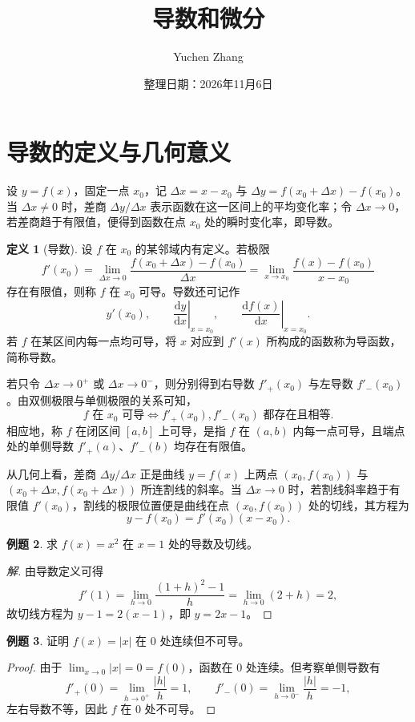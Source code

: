 \documentclass[UTF8,fontset=fandol,a4paper,12pt]{ctexart}
\title{导数和微分}
\author{Yuchen Zhang}
\date{整理日期：2026年11月6日}
\makeatletter
\newcommand{\dd}{\mathrm d}
\theoremstyle{definition}
\newtheorem{definition}{定义}[section]
\newtheorem{example}[definition]{例题}
\renewcommand{\maketitle}{\begin{center}{\LARGE\bfseries\@title\par}\vspace{0.6em}\@author\par\vspace{0.2em}{\small\@date\par}\end{center}}
\makeatother
\begin{document}
\maketitle
\section{导数的定义与几何意义}
设 $y=f(x)$，固定一点 $x_0$，记 $\Delta x=x-x_0$ 与 $\Delta y=f(x_0+\Delta x)-f(x_0)$。当 $\Delta x\ne0$ 时，差商 $\Delta y/\Delta x$ 表示函数在这一区间上的平均变化率；令 $\Delta x\to0$，若差商趋于有限值，便得到函数在点 $x_0$ 处的瞬时变化率，即导数。

\begin{definition}[导数]
设 $f$ 在 $x_0$ 的某邻域内有定义。若极限
\[
 \boxed{f'(x_0)=\lim_{\Delta x\to0}
 \frac{f(x_0+\Delta x)-f(x_0)}{\Delta x}
 =\lim_{x\to x_0}\frac{f(x)-f(x_0)}{x-x_0}}
\]
存在有限值，则称 $f$ 在 $x_0$ 可导。导数还可记作
\[
 y'(x_0),\qquad \left.\frac{\dd y}{\dd x}\right|_{x=x_0},
 \qquad \left.\frac{\dd f(x)}{\dd x}\right|_{x=x_0}.
\]
若 $f$ 在某区间内每一点均可导，将 $x$ 对应到 $f'(x)$ 所构成的函数称为导函数，简称导数。
\end{definition}

若只令 $\Delta x\to0^+$ 或 $\Delta x\to0^-$，则分别得到右导数 $f'_+(x_0)$ 与左导数 $f'_-(x_0)$。由双侧极限与单侧极限的关系可知，
\[
 f\text{ 在 }x_0\text{ 可导}
 \iff f'_+(x_0),f'_-(x_0)\text{ 都存在且相等}.
\]
相应地，称 $f$ 在闭区间 $[a,b]$ 上可导，是指 $f$ 在 $(a,b)$ 内每一点可导，且端点处的单侧导数 $f'_+(a)$、$f'_-(b)$ 均存在有限值。

从几何上看，差商 $\Delta y/\Delta x$ 正是曲线 $y=f(x)$ 上两点 $(x_0,f(x_0))$ 与 $(x_0+\Delta x,f(x_0+\Delta x))$ 所连割线的斜率。当 $\Delta x\to0$ 时，若割线斜率趋于有限值 $f'(x_0)$，割线的极限位置便是曲线在点 $(x_0,f(x_0))$ 处的切线，其方程为
\[
 y-f(x_0)=f'(x_0)(x-x_0).
\]

\begin{example}
求 $f(x)=x^2$ 在 $x=1$ 处的导数及切线。
\end{example}
\begin{proof}[解]
由导数定义可得
\[
 f'(1)=\lim_{h\to0}\frac{(1+h)^2-1}{h}
 =\lim_{h\to0}(2+h)=2,
\]
故切线方程为 $y-1=2(x-1)$，即 $y=2x-1$。
\end{proof}

\begin{example}
证明 $f(x)=|x|$ 在 $0$ 处连续但不可导。
\end{example}
\begin{proof}
由于 $\lim_{x\to0}|x|=0=f(0)$，函数在 $0$ 处连续。但考察单侧导数有
\[
 f'_+(0)=\lim_{h\to0^+}\frac{|h|}{h}=1,
 \qquad f'_-(0)=\lim_{h\to0^-}\frac{|h|}{h}=-1,
\]
左右导数不等，因此 $f$ 在 $0$ 处不可导。
\end{proof}
\end{document}

